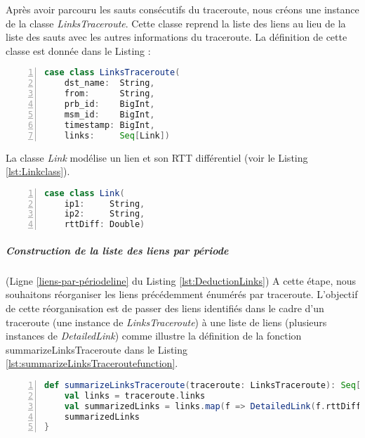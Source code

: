 Après avoir parcouru les sauts consécutifs du traceroute, nous créons une instance de la classe \textit{LinksTraceroute}. Cette classe reprend la liste des liens au lieu de la liste des sauts avec les autres informations du traceroute. La définition de cette classe est donnée dans le Listing :
\begin{lstlisting}[language=scala,firstnumber=1, caption={Définition de la fonction},label={lst:function}, basicstyle = \footnotesize,escapechar=|,numbers=left,
stepnumber=1] 
case class LinksTraceroute(
	dst_name:  String,
	from:      String,
	prb_id:    BigInt,
	msm_id:    BigInt,
	timestamp: BigInt,
	links:     Seq[Link])
\end{lstlisting}

La classe \textit{Link} modélise un lien et son RTT différentiel (voir le Listing \ref{lst:Linkclass}).
\begin{lstlisting}[language=scala,firstnumber=1, caption={Définition de la classe Link},label={lst:Linkclass}, basicstyle = \footnotesize,escapechar=|,numbers=left,
stepnumber=1] 
case class Link(
	ip1:     String,
	ip2:     String,
	rttDiff: Double)
\end{lstlisting}

\subparagraph{Construction de la liste des liens par période } (Ligne \ref{liens-par-périodeline} du Listing \ref{lst:DeductionLinks})
A cette étape, nous souhaitons réorganiser les liens précédemment énumérés par traceroute. L'objectif de cette réorganisation est de passer des liens identifiés dans le cadre d'un traceroute (une instance de \textit{LinksTraceroute}) à une liste de liens (plusieurs instances de \textit{DetailedLink}) comme illustre la définition de la fonction summarizeLinksTraceroute dans le Listing \ref{lst:summarizeLinksTraceroutefunction}. 


\begin{lstlisting}[language=scala,firstnumber=1, caption={Définition de la fonction summarizeLinksTraceroute},label={lst:summarizeLinksTraceroutefunction}, basicstyle = \footnotesize,escapechar=|,numbers=left,
stepnumber=1] 
  def summarizeLinksTraceroute(traceroute: LinksTraceroute): Seq[DetailedLink] = {
	val links = traceroute.links
	val summarizedLinks = links.map(f => DetailedLink(f.rttDiff, LinkIPs(f.ip1, f.ip2), traceroute.prb_id))
	summarizedLinks
}
\end{lstlisting}

